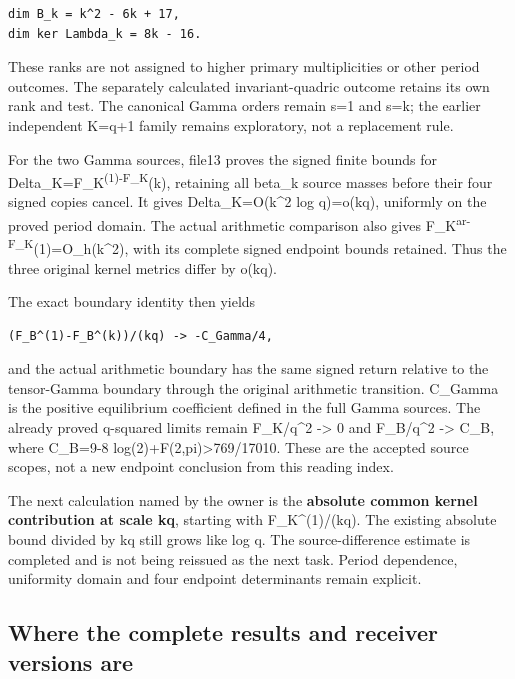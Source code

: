 \documentclass[
]{article}
\begin{document}
\begin{verbatim}
dim B_k = k^2 - 6k + 17,
dim ker Lambda_k = 8k - 16.
\end{verbatim}

These ranks are not assigned to higher primary multiplicities or other
period outcomes. The separately calculated invariant-quadric outcome
retains its own rank and test. The canonical Gamma orders remain s=1 and
s=k; the earlier independent K=q+1 family remains exploratory, not a
replacement rule.

For the two Gamma sources, file13 proves the signed finite bounds for
Delta\_K=F\_K\textsuperscript{(1)-F\_K}(k), retaining all beta\_k source
masses before their four signed copies cancel. It gives
Delta\_K=O(k\^{}2 log q)=o(kq), uniformly on the proved period domain.
The actual arithmetic comparison also gives
F\_K\textsuperscript{ar-F\_K}(1)=O\_h(k\^{}2), with its complete signed
endpoint bounds retained. Thus the three original kernel metrics differ
by o(kq).

The exact boundary identity then yields

\begin{verbatim}
(F_B^(1)-F_B^(k))/(kq) -> -C_Gamma/4,
\end{verbatim}

and the actual arithmetic boundary has the same signed return relative
to the tensor-Gamma boundary through the original arithmetic transition.
C\_Gamma is the positive equilibrium coefficient defined in the full
Gamma sources. The already proved q-squared limits remain F\_K/q\^{}2
-\textgreater{} 0 and F\_B/q\^{}2 -\textgreater{} C\_B, where C\_B=9-8
log(2)+F(2,pi)\textgreater769/17010. These are the accepted source
scopes, not a new endpoint conclusion from this reading index.

The next calculation named by the owner is the \textbf{absolute common
kernel contribution at scale kq}, starting with F\_K\^{}(1)/(kq). The
existing absolute bound divided by kq still grows like log q. The
source-difference estimate is completed and is not being reissued as the
next task. Period dependence, uniformity domain and four endpoint
determinants remain explicit.

\subsection{Where the complete results and receiver versions
are}\label{where-the-complete-results-and-receiver-versions-are}
\end{document}
